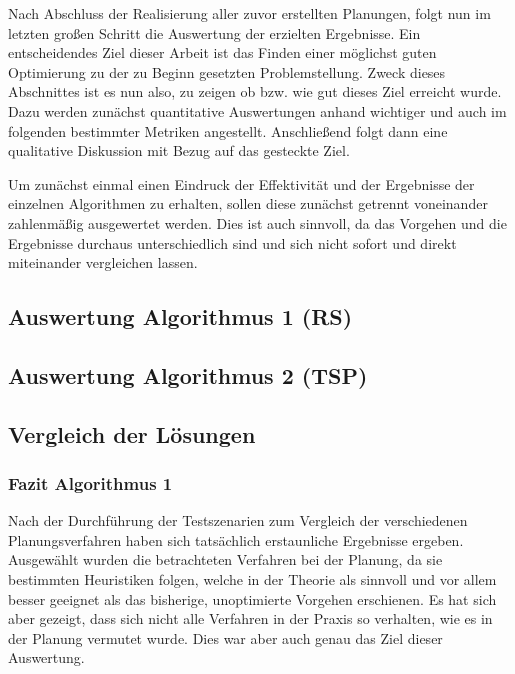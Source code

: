 
Nach Abschluss der Realisierung aller zuvor erstellten Planungen, folgt nun im letzten großen Schritt die Auswertung der erzielten Ergebnisse. Ein entscheidendes Ziel dieser Arbeit ist das Finden einer möglichst guten Optimierung zu der zu Beginn gesetzten Problemstellung. Zweck dieses Abschnittes ist es nun also, zu zeigen ob bzw. wie gut dieses Ziel erreicht wurde. Dazu werden zunächst quantitative Auswertungen anhand wichtiger und auch im folgenden bestimmter Metriken angestellt. Anschließend folgt dann eine qualitative Diskussion mit Bezug auf das gesteckte Ziel.

Um zunächst einmal einen Eindruck der Effektivität und der Ergebnisse der einzelnen Algorithmen zu erhalten, sollen diese zunächst getrennt voneinander zahlenmäßig ausgewertet werden. Dies ist auch sinnvoll, da das Vorgehen und die Ergebnisse durchaus unterschiedlich sind und sich nicht sofort und direkt miteinander vergleichen lassen.

\subsection{Auswertung Algorithmus 1 (RS)}




\subsection{Auswertung Algorithmus 2 (TSP)}




\subsection{Vergleich der Lösungen}




\subsubsection{Fazit Algorithmus 1}

Nach der Durchführung der Testszenarien zum Vergleich der verschiedenen Planungsverfahren haben sich tatsächlich erstaunliche Ergebnisse ergeben. Ausgewählt wurden die betrachteten Verfahren bei der Planung, da sie bestimmten Heuristiken folgen, welche in der Theorie als sinnvoll und vor allem besser geeignet als das bisherige, unoptimierte Vorgehen erschienen. Es hat sich aber gezeigt, dass sich nicht alle Verfahren in der Praxis so verhalten, wie es in der Planung vermutet wurde. Dies war aber auch genau das Ziel dieser Auswertung.


